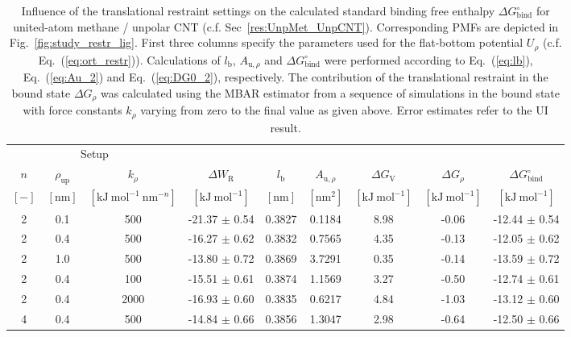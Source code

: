 \documentclass[9pt,lessons,pubversion]{livecoms}
\begin{document}
\begin{table}[ht]
\caption{\label{tbl:1Dsetup}
Influence of the translational restraint settings on the calculated standard binding free enthalpy $\Delta G^\circ_\mathrm{bind}$ for united-atom methane / unpolar CNT (c.f. Sec~\ref{res:UnpMet_UnpCNT}).
Corresponding PMFs are depicted in Fig.~\ref{fig:study_restr_lig}. 
First three columns specify the parameters used for the flat-bottom potential $U_\rho$ (c.f. Eq.~(\ref{eq:ort_restr})). 
Calculations of $l_\mathrm{b}$, $A_{\mathrm{u},\rho}$ and $\Delta G^\circ_\mathrm{bind}$ were performed according to Eq.~(\ref{eq:lb}), Eq.~(\ref{eq:Au_2}) and Eq.~(\ref{eq:DG0_2}), respectively. 
The contribution of the translational restraint in the bound state $\Delta G_\rho$ was calculated using the MBAR estimator from a sequence of simulations in the bound state with force constants $k_\rho$ varying from zero to the final value as given above. Error estimates refer to the UI result.
}
\centering
\begin{tabular}{ccc ccc ccc}\hline
\multicolumn{3}{c}{Setup} &  \\
\cline{1-3} 
$n$ & $\rho_\mathrm{up}$ & $k_\rho$  & $\Delta W_\mathrm{R}$  & $l_\mathrm{b}$ & $A_{\mathrm{u},\rho}$ & $\Delta G_\mathrm{V}$ & 
$\Delta G_\rho$ & $\Delta G^\circ_\mathrm{bind}$ \\
$[-]$ & $[\mathrm{nm}]$ & $[\mathrm{kJ~mol}^{-1}~\mathrm{nm}^{-n}]$ & $[\mathrm{kJ~mol}^{-1}]$ & $[\mathrm{nm}]$ & $[\mathrm{nm}^2]$ & $[\mathrm{kJ~mol}^{-1}]$ & $[\mathrm{kJ~mol}^{-1}]$ & 
$[\mathrm{kJ~mol}^{-1}]$ \\ 
\hline
2 & 0.1 & 500  &  -21.37 $\pm$ 0.54 & 0.3827 &  0.1184 &  8.98  & -0.06 &  -12.44 $\pm$  0.54 \\   
2 & 0.4 & 500  &  -16.27 $\pm$ 0.62 & 0.3832 &  0.7565 &  4.35  & -0.13 &  -12.05 $\pm$  0.62\\
2 & 1.0 & 500  &  -13.80 $\pm$ 0.72 & 0.3869 &  3.7291 &  0.35  &  -0.14  &  -13.59 $\pm$ 0.72\\
2 & 0.4 & 100  &  -15.51 $\pm$ 0.61 & 0.3874 &  1.1569 &  3.27  &  -0.50 &  -12.74 $\pm$ 0.61\\
2 & 0.4 & 2000 & -16.93 $\pm$ 0.60 & 0.3835 &  0.6217 &  4.84  &  -1.03  &  -13.12 $\pm$ 0.60\\
4 & 0.4 & 500  &  -14.84 $\pm$ 0.66 & 0.3856 &  1.3047 &  2.98  &  -0.64 &  -12.50 $\pm$ 0.66\\ 
\hline
\end{tabular}
\end{table}
\end{document}
